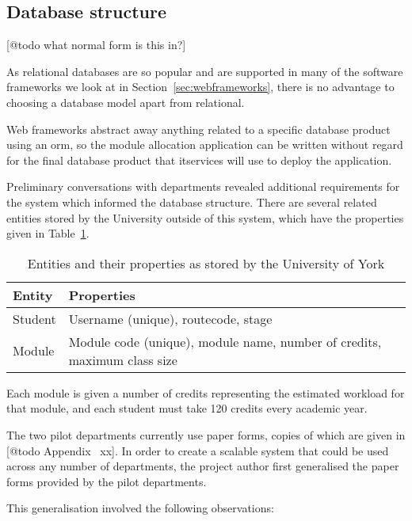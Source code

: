 
\subsection{Database structure}

[@todo what normal form is this in?]

As relational databases are so popular and are supported in many of the
software frameworks we look at in Section~\ref{sec:webframeworks}, there is no
advantage to choosing a database model apart from relational.

Web frameworks abstract away anything related to a specific database product
using an \gls{orm}, so the module allocation application can be written
without regard for the final database product that \gls{itservices} will use
to deploy the application.

Preliminary conversations with departments revealed additional requirements
for the system which informed the database structure. There are several
related entities stored by the University outside of this system, which have
the properties given in Table~\ref{development_database_uni_entities}.

\begin{table}
  \begin{tabular}{ | l | l | }
    \hline
    \textbf{Entity} & \textbf{Properties} \\
    \hline
    Student    & Username (unique), \gls{routecode}, \gls{stage} \\
    Module     & Module code (unique), module name, number of credits, maximum class size \\
    \hline
  \end{tabular}
  \caption{Entities and their properties as stored by the University of York}
  \label{development_database_uni_entities}
\end{table}

Each module is given a number of credits representing the estimated workload
for that module, and each student must take 120 credits every academic year.

The two pilot departments currently use paper forms, copies of which are given
in [@todo Appendix~ xx]. In order to create a scalable system that could be
used across any number of departments, the project author first generalised
the paper forms provided by the pilot departments.

This generalisation involved the following observations:

